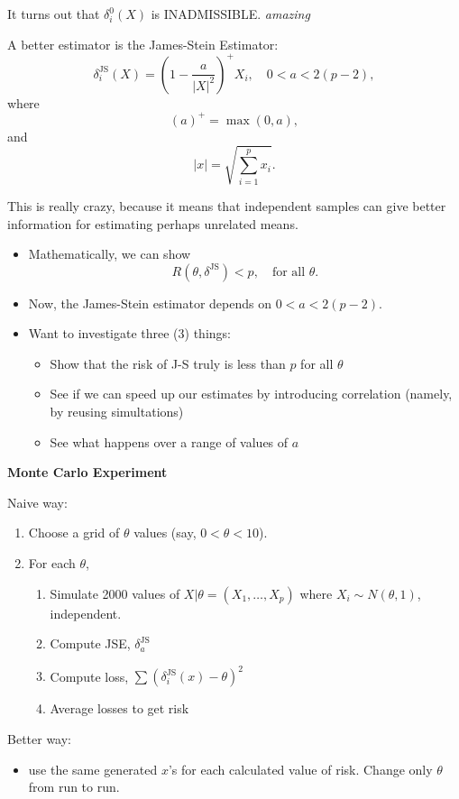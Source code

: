 \documentclass[captions=tableheading]{scrbook}
\begin{document}
It turns out that $\delta_{i}^{0}(X)$ is INADMISSIBLE.  \emph{amazing}

A better estimator is the James-Stein Estimator:
\[
\delta_{i}^{\mathrm{JS}}(X) = \left(1 - \frac{a}{|X|^{2}} \right)^{+} X_{i}, \quad 0 < a < 2(p - 2),
\]
where
\[
(a)^{+} = \max (0, a),
\]
and
\[
 | x | = \sqrt{\sum_{i=1}^{p}x_{i}}.
\]

This is really crazy, because it means that independent samples can give better information for estimating perhaps unrelated means.


\begin{itemize}
\item Mathematically, we can show
  \[
  R(\theta,\delta^{\mathrm{JS}}) < p,\quad \mbox{for all $\theta$.}
  \]
\item Now, the James-Stein estimator depends on $0 < a < 2(p-2)$.
\item Want to investigate three (3) things:
\begin{itemize}
\item Show that the risk of J-S truly is less than $p$ for all $\theta$
\item See if we can speed up our estimates by introducing correlation (namely, by reusing simultations)
\item See what happens over a range of values of $a$
\end{itemize}
\end{itemize}
\textbf{Monte Carlo Experiment}

Naive way: 

\begin{enumerate}
\item Choose a grid of $\theta$ values (say, $0 < \theta < 10$).
\item For each $\theta$,
\begin{enumerate}
\item Simulate 2000 values of $X|\theta = (X_{1},\ldots,X_{p})$ where $X_{i} \sim N(\theta,1)$, independent.
\item Compute JSE, $\delta_{a}^{\mathrm{JS}}$
\item Compute loss, $\sum \left( \delta_{i}^{\mathrm{JS}}(x) - \theta \right)^{2}$
\item Average losses to get risk
\end{enumerate}
\end{enumerate}

Better way:

\begin{itemize}
\item use the same generated $x$'s for each calculated value of risk.  Change only $\theta$ from run to run.
\end{itemize}
\end{document}
